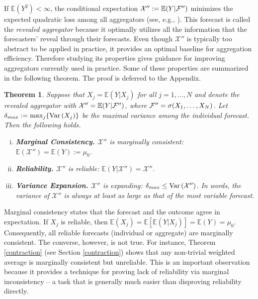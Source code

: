 \documentclass[11pt]{article}
\newcommand{\E}{\mathbb{E}}
\newtheorem{theorem}{Theorem}[section]
\theoremstyle{definition}
\theoremstyle{definition}
\def\F{{\cal F}}
\def\E{{\mathbb E}}
\def\Var{{\rm Var}\,}
\begin{document}
If $\E\left(Y^2\right) < \infty$, the conditional expectation
$\mathcal{X}'' := \E(Y | \F'')$ minimizes the expected quadratic loss
among all aggregators (see, e.g., \citealt{durrett2010probability}). This forecast is called the \textit{revealed
aggregator} because it optimally utilizes all the information that the
forecasters' reveal through their forecasts. Even though
$\mathcal{X}'' $ is typically too abstract to be applied in practice,
it provides an optimal baseline for aggregation
efficiency. Therefore studying its properties gives guidance for
improving aggregators currently used in practice. Some of these
properties are summarized in the following theorem. The proof is deferred to the Appendix.



\begin{theorem} \label{optimal}
Suppose that $X_j = \E(Y | X_j)$ for all $j = 1, \dots, N$ and denote the revealed aggregator with $\mathcal{X}'' = \E(Y | \F'')$, where $\F'' = \sigma(X_1, \dots, X_N)$. 
Let $\delta_{max} := \max_j \{ \Var(X_j)  \}$ be the maximal variance among the individual forecast.
 Then the following holds.
\begin{enumerate}[i)] \label{properties}
\item \textbf{Marginal Consistency.} $\mathcal{X}''$ is marginally consistent:  $\E(\mathcal{X}'') = \E(Y) :=  \mu_0$.
\item \textbf{Reliability.} $\mathcal{X}''$ is reliable: $\E(Y|\mathcal{X}'') = \mathcal{X}''$. 
\item \textbf{Variance Expansion.} $\mathcal{X}''$ is expanding: $\delta_{max} \leq \Var(\mathcal{X}'')$. In words, the variance of $\mathcal{X}''$ is always at least as large as that of the most variable forecast. 
\end{enumerate}
\end{theorem}
Marginal consistency states that the forecast and the outcome agree in expectation. If $X_j$ is reliable, then $\E(X_j) = \E[\E(Y|X_j)] = \E(Y) = \mu_0$. Consequently, all reliable forecasts (individual or aggregate) are marginally consistent. The converse, however, is not true. For instance, Theorem \ref{contraction} (see Section \ref{contraction})  shows that any non-trivial weighted average is marginally consistent but unreliable. This is an important observation because it provides a technique for proving lack of reliability via marginal inconsistency -- a task that is generally much easier than disproving reliability directly.
\end{document}
